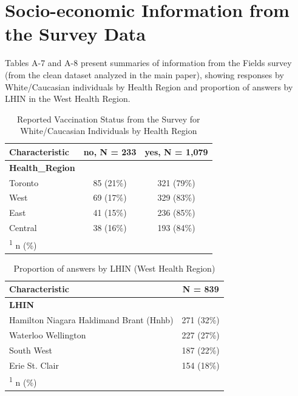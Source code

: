 \documentclass[
  letterpaper,
  DIV=11,
  numbers=noendperiod]{scrartcl}
\begin{document}
\hypertarget{socio-economic-information-from-the-survey-data}{%
\section{Socio-economic Information from the Survey
Data}\label{socio-economic-information-from-the-survey-data}}

Tables A-7 and A-8 present summaries of information from the Fields
survey (from the clean dataset analyzed in the main paper), showing
responses by White/Caucasian individuals by Health Region and proportion
of answers by LHIN in the West Health Region.

\hypertarget{tbl-hr-percentages}{}
\begin{table}
\caption{\label{tbl-hr-percentages}Reported Vaccination Status from the Survey for White/Caucasian
Individuals by Health Region }\tabularnewline

\centering
\begin{tabular}{lcc}
\toprule
\textbf{Characteristic} & \textbf{no}, N = 233 & \textbf{yes}, N = 1,079\\
\midrule
\textbf{Health\_Region} &  & \\
\hspace{1em}Toronto & 85 (21\%) & 321 (79\%)\\
\hspace{1em}West & 69 (17\%) & 329 (83\%)\\
\hspace{1em}East & 41 (15\%) & 236 (85\%)\\
\hspace{1em}Central & 38 (16\%) & 193 (84\%)\\
\bottomrule
\multicolumn{3}{l}{\rule{0pt}{1em}\textsuperscript{1} n (\%)}\\
\end{tabular}
\end{table}

\hypertarget{tbl-west-hr-lhin}{}
\begin{table}
\caption{\label{tbl-west-hr-lhin}Proportion of answers by LHIN (West Health Region) }\tabularnewline

\centering
\begin{tabular}{lc}
\toprule
\textbf{Characteristic} & \textbf{N = 839}\\
\midrule
\textbf{LHIN} & \\
\hspace{1em}Hamilton Niagara Haldimand Brant (Hnhb) & 271 (32\%)\\
\hspace{1em}Waterloo Wellington & 227 (27\%)\\
\hspace{1em}South West & 187 (22\%)\\
\hspace{1em}Erie St. Clair & 154 (18\%)\\
\bottomrule
\multicolumn{2}{l}{\rule{0pt}{1em}\textsuperscript{1} n (\%)}\\
\end{tabular}
\end{table}
\end{document}
